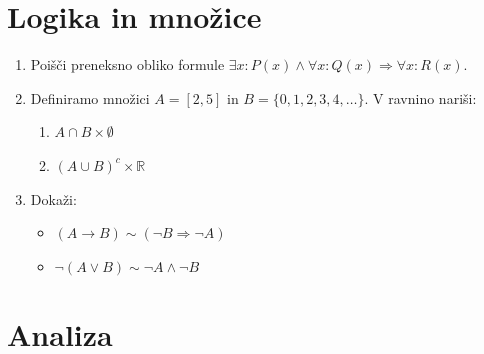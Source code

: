 \documentclass[a4paper,12pt]{article}
\begin{document}

\section*{Logika in množice}

\begin{enumerate}
\item
Poišči preneksno obliko formule \(\exists x : P(x) \wedge  \forall x : Q(x) \Rightarrow \forall x : R(x).\)

\item
Definiramo množici \(A = [2,5]\) in \(B = \{0,1,2,3,4, \dots\}\).
V ravnino nariši:
\begin{enumerate}
\item \(A \cap B \times \emptyset\)
\item \((A \cup B)^c \times \mathbb{R}\)
\end{enumerate}

\item
Dokaži:
\begin{itemize}
\item \((A \rightarrow B) \sim (\neg B \Rightarrow \neg A)\)
\item \(\neg (A \vee B) \sim \neg A \wedge \neg B\) 
\end{itemize}
\end{enumerate}

\section*{Analiza}
\end{document}
